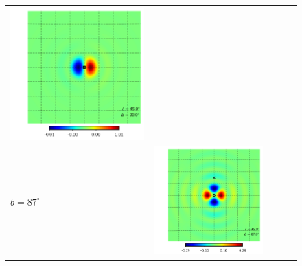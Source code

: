 \documentclass[a4paper,11pt]{article}
\begin{document}
\begin{figure}[t]
\begin{center}
\begin{tabular}{m{8ex}m{}m{}|m{}m{}}
\hspace{\kernelfigspace}\includegraphics[width=\kernelfigwidth]{qu2eb_iker_con_lat90_lon45.pdf} \\
$b=87^\circ$&
\hspace{\kernelfigspace}\includegraphics[width=\kernelfigwidth]{qu2eb_rker_rad_lat87_lon45.pdf} &

\end{tabular}
\end{center}
\end{figure}
\end{document}
